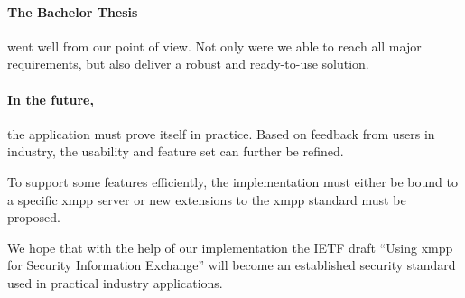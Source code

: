 \paragraph{The Bachelor Thesis} went well from our point of view.
Not only were we able to reach all major requirements, but also deliver a robust and ready-to-use solution.

\paragraph{In the future,} the application must prove itself in practice.
Based on feedback from users in industry, the usability and feature set can further be refined.

To support some features efficiently, the implementation must either be bound to a specific \gls{xmpp} server or new extensions to the \gls{xmpp} standard must be proposed.

We hope that with the help of our implementation the IETF draft ``Using \gls{xmpp} for Security Information Exchange'' will become an established security standard used in practical industry applications.
